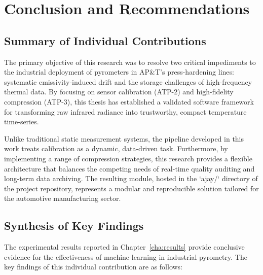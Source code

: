 \chapter{Conclusion and Recommendations}
\label{cha:conclusion}

\section{Summary of Individual Contributions}
\label{sec:summary}

The primary objective of this research was to resolve two critical impediments to the industrial deployment of pyrometers in AP\&T's press-hardening lines: systematic emissivity-induced drift and the storage challenges of high-frequency thermal data. By focusing on sensor calibration (ATP-2) and high-fidelity compression (ATP-3), this thesis has established a validated software framework for transforming raw infrared radiance into trustworthy, compact temperature time-series.

Unlike traditional static measurement systems, the pipeline developed in this work treats calibration as a dynamic, data-driven task. Furthermore, by implementing a range of compression strategies, this research provides a flexible architecture that balances the competing needs of real-time quality auditing and long-term data archiving. The resulting module, hosted in the `ajay/` directory of the project repository, represents a modular and reproducible solution tailored for the automotive manufacturing sector.

\section{Synthesis of Key Findings}
\label{sec:findings}

The experimental results reported in Chapter~\ref{cha:results} provide conclusive evidence for the effectiveness of machine learning in industrial pyrometry. The key findings of this individual contribution are as follows:

